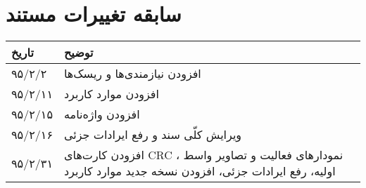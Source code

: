 
\chapter{سابقه تغییرات مستند}

\begin{table}[H]
	\centering
	\begin{tabular}{|p{3cm}|p{5cm}|}
		\hline
		تاریخ & توضیح \\
		\hline
		
		۹۵/۲/۲  & افزودن نیازمندی‌ها و ریسک‌ها \\
		۹۵/۲/۱۱  & افزودن موارد کاربرد \\
		۹۵/۲/۱۵  & افزودن واژه‌نامه \\
		۹۵/۲/۱۶  & ویرایش کلّی سند و رفع ایرادات جزئی \\
		۹۵/۲/۳۱  & افزودن کارت‌های CRC ، نمودارهای فعالیت و تصاویر واسط اولیه، رفع ایرادات جزئی، افزودن نسخه جدید موارد کاربرد \\
		\hline
	\end{tabular}
\end{table}
